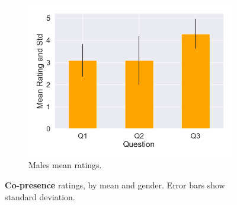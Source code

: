 \begin{figure}[H]
 \begin{subfigure}[b]{\textwidth}
 \centering
 \includegraphics[scale=0.5]{Files/Plots/copresence_mean_m.png}
 \caption{Males mean ratings.}
 \label{fig:copresMale}
 \end{subfigure}
 \caption{\textbf{Co-presence} ratings, by mean and gender. Error bars show standard deviation.}
\label{fig:coAll}
\end{figure}

